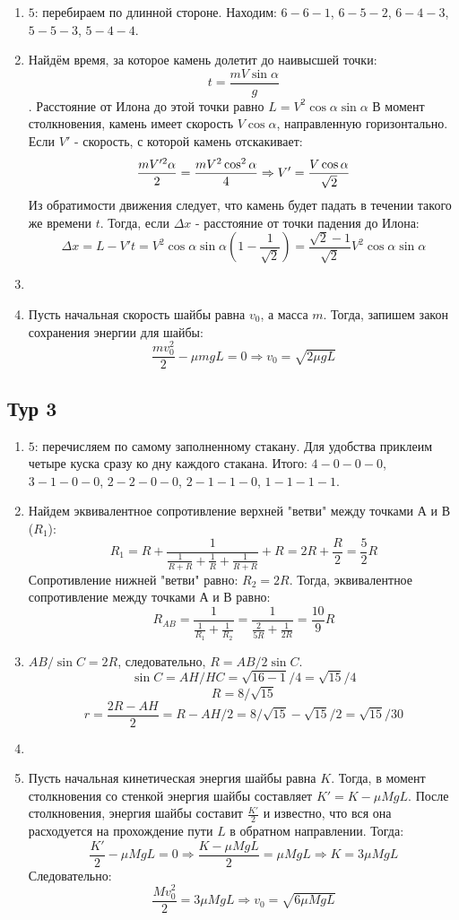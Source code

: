 \documentclass[12pt]{article} %
\begin{document}
\begin{enumerate}
\item $5$: перебираем по длинной стороне. Находим: $6-6-1$, $6-5-2$, $6-4-3$, $5-5-3$, $5-4-4$.
\item Найдём время, за которое камень долетит до наивысшей точки: \[ t = \frac{mV\sin\alpha}{g} \]. Расстояние от Илона до этой точки равно $L = V^2 \cos\alpha \sin\alpha$ В момент столкновения, камень имеет скорость $V\cos\alpha$, направленную горизонтально. Если $V'$ - скорость, с которой камень отскакивает: \[\frac{mV'^2\alpha}{2} = \frac{mV^2\cos^2\alpha}{4} \Rightarrow V' = {{V\cos\alpha}\over{\sqrt{2}}} \] Из обратимости движения следует, что камень будет падать в течении такого же времени $t$. Тогда, если $\Delta x$ - расстояние от точки падения до Илона: \[ \Delta x = L - V't =  V^2 \cos\alpha \sin\alpha \left(1 - \frac{1}{\sqrt{2}} \right) = \frac{\sqrt{2} - 1}{\sqrt2} V^2 \cos\alpha \sin\alpha \]
\item
\item Пусть начальная скорость шайбы равна $v_0$, а масса $m$. Тогда, запишем закон сохранения энергии для шайбы: \[\frac{mv_0^2}{2} - \mu mgL = 0 \Rightarrow v_0 = \sqrt{2\mu gL}\]
\end{enumerate}

\subsection*{Тур 3}

\begin{enumerate}
\item $5$: перечисляем по самому заполненному стакану. Для удобства приклеим четыре куска сразу ко дну каждого стакана. 
Итого: $4-0-0-0$, $3-1-0-0$, $2-2-0-0$, $2-1-1-0$, $1-1-1-1$.
\item Найдем эквивалентное сопротивление верхней "ветви" между точками А и В ($R_1$): \[R_1 = R + \frac{1}{\frac{1}{R+ R} + \frac{1}{R} + \frac{1}{R+ R}} + R = 2R + \frac{R}{2} = \frac{5}{2} R\]
Сопротивление нижней "ветви" равно: $R_2 = 2R$. Тогда, эквивалентное сопротивление между точками А и В равно: \[ R_{AB} =\frac{1}{ \frac{1}{R_1} +  \frac{1}{R_2}} = \frac{1}{ \frac{2}{5R} +  \frac{1}{2R}}= \frac{10}{9} R\]
\item $AB/\sin C = 2R$, следовательно, $R= AB/2\sin C$. 
\[
\sin C = AH/HC = \sqrt{16-1}/4=\sqrt{15}/4    
\]
\[
R = 8/\sqrt{15}    
\]
\[
r = \frac{2R - AH}{2} = R - AH/2 = 8/\sqrt{15} - \sqrt{15}/2 = \sqrt{15}/30
\]
\item 
\item Пусть начальная кинетическая энергия шайбы равна $K$. Тогда, в момент столкновения со стенкой энергия шайбы составляет $K' = K - \mu MgL$. После столкновения, энергия шайбы составит $\frac{K'}{2}$ и известно, что вся она расходуется на прохождение пути $L$  в обратном направлении. Тогда: 
\[ \frac{K'}{2} - \mu MgL = 0 \Rightarrow \frac{K - \mu MgL}{2} = \mu MgL \Rightarrow K = 3 \mu MgL \]
Следовательно:
\[ \frac{Mv_0^2}{2}= 3 \mu MgL \Rightarrow v_0 = \sqrt{6\mu MgL} \]
\end{enumerate}
\end{document}
